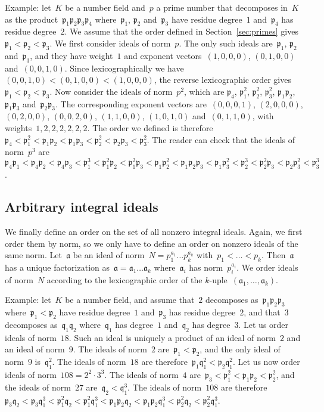 \documentclass{article}
\def\a{{\mathfrak a}}
\def\p{{\mathfrak p}}
\def\q{{\mathfrak q}}
\begin{document}
Example: let~$K$ be a number field and~$p$ a prime number that
decomposes in~$K$ as the product~$\p_1\p_2\p_3\p_4$ where~$\p_1$,
$\p_2$ and~$\p_3$ have residue degree~$1$ and~$\p_4$ has residue
degree~$2$. We assume that the order defined in
Section~\ref{sec:primes} gives~$\p_1 < \p_2 < \p_3$. We first consider
ideals of norm~$p$. The only such ideals are~$\p_1$, $\p_2$
and~$\p_3$, and they have weight~$1$ and exponent vectors~$(1,0,0,0)$,
$(0,1,0,0)$ and~$(0,0,1,0)$. Since lexicographically we
have~$(0,0,1,0)<(0,1,0,0)<(1,0,0,0)$, the reverse lexicographic order
gives~$\p_1<\p_2<\p_3$. Now consider the ideals of norm~$p^2$, which
are $\p_4$, $\p_1^2$, $\p_2^2$, $\p_3^2$, $\p_1\p_2$, $\p_1\p_3$
and~$\p_2\p_3$. The corresponding exponent vectors are~$(0,0,0,1)$,
$(2,0,0,0)$, $(0,2,0,0)$, $(0,0,2,0)$, $(1,1,0,0)$, $(1,0,1,0)$
and~$(0,1,1,0)$, with weights~$1,2,2,2,2,2,2$. The order we defined is
therefore~$\p_4 < \p_1^2 < \p_1\p_2 < \p_1\p_3 < \p_2^2 < \p_2\p_3 <
\p_3^2$. The reader can check that the ideals of norm~$p^3$
are~$\p_4\p_1 < \p_4\p_2 < \p_4\p_3 < \p_1^3 < \p_1^2\p_2 < \p_1^2\p_3
< \p_1\p_2^2 < \p_1\p_2\p_3 < \p_1\p_3^2 < \p_2^3 < \p_2^2\p_3 <
\p_2\p_3^2 < \p_3^3$.

\subsection{Arbitrary integral ideals}

We finally define an order on the set of all nonzero integral
ideals. Again, we first order them by norm, so we only have to define
an order on nonzero ideals of the same norm. Let~$\a$ be an ideal of
norm~$N = p_1^{a_1}\dots p_k^{a_k}$ with~$p_1 < \dots <
p_k$. Then~$\a$ has a unique factorization as~$\a = \a_1\dots\a_k$
where~$\a_i$ has norm~$p_i^{a_i}$. We order ideals of norm~$N$
according to the lexicographic order of the
$k$-uple~$(\a_1,\dots,\a_k)$.

Example: let~$K$ be a number field, and assume that~$2$ decomposes
as~$\p_1\p_2\p_3$ where~$\p_1<\p_2$ have residue degree~$1$ and~$\p_3$ has
residue degree~$2$, and that~$3$ decomposes as~$\q_1\q_2$ where~$\q_1$ has
degree~$1$ and~$\q_2$ has degree~$3$. Let us order ideals of norm~$18$. Such an
ideal is uniquely a product of an ideal of norm~$2$ and an ideal of norm~$9$. The ideals
of norm~$2$ are~$\p_1 < \p_2$, and the only ideal of norm~$9$ is~$\q_1^2$. The
ideals of norm~$18$ are therefore~$\p_1\q_1^2 < \p_2\q_1^2$. Let us now order ideals
of norm~$108 = 2^2\cdot 3^3$. The ideals of norm~$4$ are~$\p_3 < \p_1^2 < \p_1\p_2 <
\p_2^2$, and the ideals of norm~$27$ are~$\q_2 < \q_1^3$. The ideals of
norm~$108$ are therefore~$\p_3\q_2 < \p_3\q_1^3 < \p_1^2\q_2 < \p_1^2\q_1^3 <
\p_1\p_2\q_2 < \p_1\p_2\q_1^3 < \p_2^2\q_2 < \p_2^2\q_1^3$.
\end{document}
